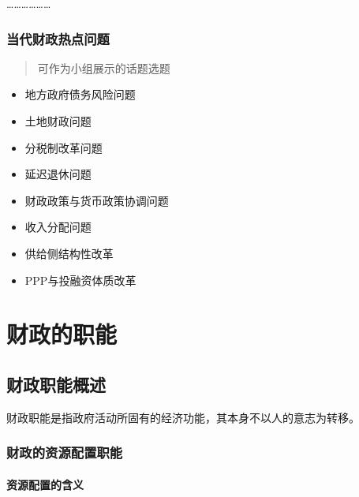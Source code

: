 \documentclass[
]{book}
\providecommand{\tightlist}{%
  \setlength{\itemsep}{0pt}\setlength{\parskip}{0pt}}
\begin{document}
\ldots\ldots\ldots\ldots\ldots\ldots{}

\hypertarget{ux5f53ux4ee3ux8d22ux653fux70edux70b9ux95eeux9898}{%
\subsection{当代财政热点问题}\label{ux5f53ux4ee3ux8d22ux653fux70edux70b9ux95eeux9898}}

\begin{quote}
可作为小组展示的话题选题
\end{quote}

\begin{itemize}
\tightlist
\item
  地方政府债务风险问题
\item
  土地财政问题
\item
  分税制改革问题
\item
  延迟退休问题
\item
  财政政策与货币政策协调问题
\item
  收入分配问题
\item
  供给侧结构性改革
\item
  PPP与投融资体质改革
\end{itemize}

\hypertarget{ux804cux80fd}{%
\chapter{财政的职能}\label{ux804cux80fd}}

\hypertarget{ux8d22ux653fux804cux80fdux6982ux8ff0}{%
\section{财政职能概述}\label{ux8d22ux653fux804cux80fdux6982ux8ff0}}

财政职能是指政府活动所固有的经济功能，其本身不以人的意志为转移。

\hypertarget{ux8d22ux653fux7684ux8d44ux6e90ux914dux7f6eux804cux80fd}{%
\subsection{财政的资源配置职能}\label{ux8d22ux653fux7684ux8d44ux6e90ux914dux7f6eux804cux80fd}}

\hypertarget{ux8d44ux6e90ux914dux7f6eux7684ux542bux4e49}{%
\subsubsection{资源配置的含义}\label{ux8d44ux6e90ux914dux7f6eux7684ux542bux4e49}}
\end{document}
